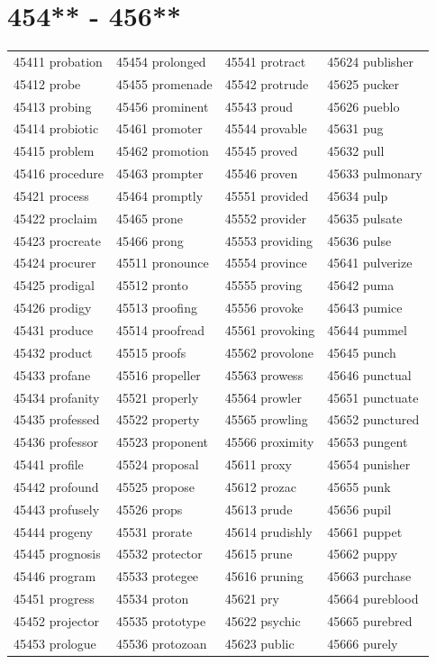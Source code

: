 \documentclass[10pt, oneside]{book}
\begin{document}
\begin{table}
	\centering
	\section*{454** - 456**}
	\begin{tabular}{l l l l}
45411 probation &45454 prolonged &45541 protract &45624 publisher\\
45412 probe &45455 promenade &45542 protrude &45625 pucker\\
45413 probing &45456 prominent &45543 proud &45626 pueblo\\
45414 probiotic &45461 promoter &45544 provable &45631 pug\\
45415 problem &45462 promotion &45545 proved &45632 pull\\
45416 procedure &45463 prompter &45546 proven &45633 pulmonary\\
45421 process &45464 promptly &45551 provided &45634 pulp\\
45422 proclaim &45465 prone &45552 provider &45635 pulsate\\
45423 procreate &45466 prong &45553 providing &45636 pulse\\
45424 procurer &45511 pronounce &45554 province &45641 pulverize\\
45425 prodigal &45512 pronto &45555 proving &45642 puma\\
45426 prodigy &45513 proofing &45556 provoke &45643 pumice\\
45431 produce &45514 proofread &45561 provoking &45644 pummel\\
45432 product &45515 proofs &45562 provolone &45645 punch\\
45433 profane &45516 propeller &45563 prowess &45646 punctual\\
45434 profanity &45521 properly &45564 prowler &45651 punctuate\\
45435 professed &45522 property &45565 prowling &45652 punctured\\
45436 professor &45523 proponent &45566 proximity &45653 pungent\\
45441 profile &45524 proposal &45611 proxy &45654 punisher\\
45442 profound &45525 propose &45612 prozac &45655 punk\\
45443 profusely &45526 props &45613 prude &45656 pupil\\
45444 progeny &45531 prorate &45614 prudishly &45661 puppet\\
45445 prognosis &45532 protector &45615 prune &45662 puppy\\
45446 program &45533 protegee &45616 pruning &45663 purchase\\
45451 progress &45534 proton &45621 pry &45664 pureblood\\
45452 projector &45535 prototype &45622 psychic &45665 purebred\\
45453 prologue &45536 protozoan &45623 public &45666 purely\\
	\end{tabular}
 \end{table}
\clearpage
\end{document}
